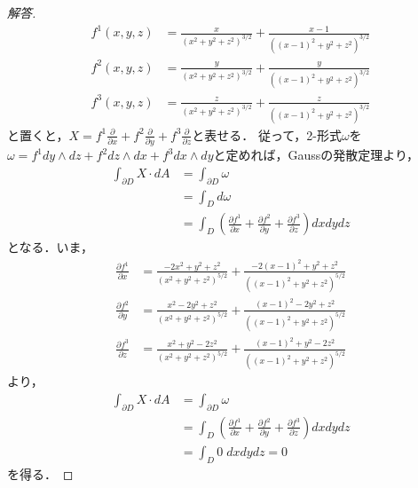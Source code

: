 \documentclass[dvipdfmx,uplatex,nosetpagesize]{jsarticle}
\theoremstyle{definition}
\theoremstyle{StatementsWithStar}
\theoremstyle{StatementsWithStar2}
\theoremstyle{StatementsWithStar3}
\theoremstyle{StatementsWithCCirc}
\theoremstyle{definition}
\begin{document}
\par
%
%
\noindent
\begin{proof}[解答]
    \begin{align*}
        f^1(x,y,z) &= \frac{x}{(x^2+y^2+z^2)^{3/2}}+\frac{x-1}{((x-1)^2+y^2+z^2)^{3/2}} \\
        f^2(x,y,z) &= \frac{y}{(x^2+y^2+z^2)^{3/2}}+\frac{y}{((x-1)^2+y^2+z^2)^{3/2}} \\
        f^3(x,y,z) &= \frac{z}{(x^2+y^2+z^2)^{3/2}}+\frac{z}{((x-1)^2+y^2+z^2)^{3/2}} 
    \end{align*}
    と置くと，$X=f^1\frac{\partial}{\partial x}+f^2\frac{\partial}{\partial y}+f^3\frac{\partial}{\partial z}$と表せる．
    従って，2-形式$\omega$を$\omega=f^1dy\wedge dz+f^2dz\wedge dx+f^3dx\wedge dy$と定めれば，Gaussの発散定理より，
    \begin{align*}
        \int_{\partial D}X\cdot dA &= \int_{\partial D}\omega \\
        &= \int_Dd\omega\\
        &= \int_D\left(\frac{\partial f^1}{\partial x}+\frac{\partial f^2}{\partial y}+\frac{\partial f^3}{\partial z}\right)dxdydz 
    \end{align*}
    となる．いま，
    \begin{align*}
        \frac{\partial f^1}{\partial x} &= \frac{-2x^2+y^2+z^2}{(x^2+y^2+z^2)^{5/2}} + \frac{-2(x-1)^2+y^2+z^2}{((x-1)^2+y^2+z^2)^{5/2}} \\
        \frac{\partial f^2}{\partial y} &= \frac{x^2-2y^2+z^2}{(x^2+y^2+z^2)^{5/2}} + \frac{(x-1)^2-2y^2+z^2}{((x-1)^2+y^2+z^2)^{5/2}} \\
        \frac{\partial f^3}{\partial z} &= \frac{x^2+y^2-2z^2}{(x^2+y^2+z^2)^{5/2}} + \frac{(x-1)^2+y^2-2z^2}{((x-1)^2+y^2+z^2)^{5/2}} 
    \end{align*}
    より，
    \begin{align*}
        \int_{\partial D}X\cdot dA &= \int_{\partial D}\omega \\
        &= \int_D\left(\frac{\partial f^1}{\partial x}+\frac{\partial f^2}{\partial y}+\frac{\partial f^3}{\partial z}\right)dxdydz \\
        &= \int_D 0 \;dxdydz = 0
    \end{align*}
    を得る．
\end{proof}
\end{document}
